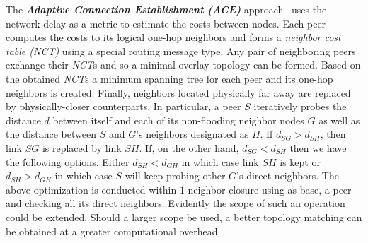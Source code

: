 The \textbf{\emph{Adaptive Connection Establishment (ACE)}} 
approach~\cite{LZXN2004} uses the network delay as a metric 
to estimate the costs between nodes. Each peer computes the costs to its
logical one-hop neighbors and forms a \emph{neighbor cost table (NCT)} 
using a special routing message type. 
Any pair of neighboring peers exchange their \emph{NCT}s 
and so a minimal overlay topology can be formed. Based on the obtained
\emph{NCT}s a minimum spanning tree for each peer and its one-hop neighbors is
created. Finally, neighbors located physically far away 
are replaced by physically-closer counterparts. 
In particular, a peer $S$ iteratively probes the distance $d$ between
itself and each of its non-flooding neighbor nodes $G$ as well as
the distance between $S$ and $G$'s neighbors designated as $H$.
If $d_{SG} > d_{SH}$, then link $SG$ is replaced by link $SH$. If, on the other
hand, $d_{SG} < d_{SH}$ then we have the following
options. Either $d_{SH} < d_{GH}$ in which case link $SH$ is kept or
$d_{SH} > d_{GH}$ in which case $S$ will keep probing other $G$'s direct
neighbors.
%
The above optimization is conducted within $1$-neighbor
closure using as base, a peer and checking all its direct neighbors.
Evidently the scope of such an operation could be extended.
Should  a larger scope be used, a better topology matching can be obtained 
at a greater computational overhead.
%
%
%

